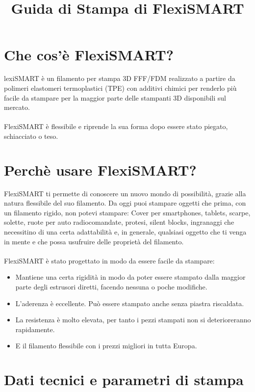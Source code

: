 \documentclass[11pt,a4paper]{article}
\title{Guida di Stampa di FlexiSMART}
\date{}
\begin{document}

\section{Che cos'è FlexiSMART?}lexiSMART è un filamento per stampa 3D FFF/FDM realizzato a partire da polimeri elastomeri termoplastici (TPE) con additivi chimici per renderlo più facile da stampare per la maggior parte delle stampanti 3D disponibili sul mercato.
\\\\
FlexiSMART è flessibile e riprende la sua forma dopo essere stato piegato, schiacciato o teso.

\section{Perchè usare FlexiSMART?}
FlexiSMART ti permette di conoscere un nuovo mondo di possibilità, grazie alla natura flessibile del suo filamento. Da oggi puoi stampare oggetti che prima, con un filamento rigido, non potevi stampare: Cover per  smartphones, tablets, scarpe, solette, ruote per auto radiocomandate, protesi, silent blocks, ingranaggi che necessitino di una certa adattabilità e, in generale, qualsiasi oggetto che ti venga in mente e che possa usufruire delle proprietà del filamento.
\\\\
FlexiSMART è stato progettato in modo da essere facile da stampare:
\begin{itemize}
\item Mantiene una certa rigidità in modo da poter essere stampato dalla maggior parte degli estrusori diretti, facendo nessuna o poche modifiche.
\item L'aderenza è eccellente. Può essere stampato anche senza piastra riscaldata.
\item La resistenza è molto elevata, per tanto i pezzi stampati non si deterioreranno rapidamente.
\item E il filamento flessibile con i prezzi migliori in tutta Europa.
\end{itemize}

\section{Dati tecnici e parametri di stampa}
\end{document}
